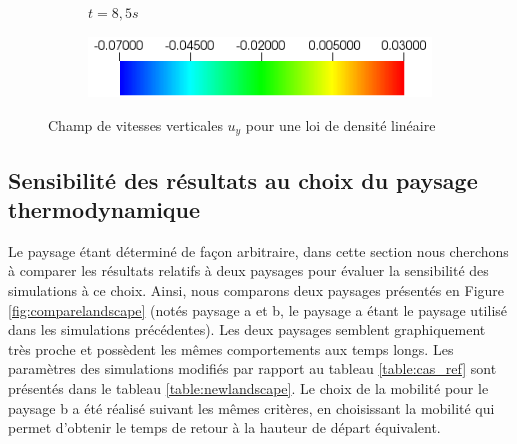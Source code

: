 \begin{figure}[H]
\begin{subfigure}[ht!]{0.18\textwidth}
		\caption{$t=8,5s$}
	\end{subfigure}
	\begin{subfigure}[ht!]{0.4\textwidth}
	\centering
	\includegraphics[width=1\textwidth]{fig_plateau_vitesse2/colorbar2.png}
\end{subfigure}
	\caption{Champ de vitesses verticales $u_y$ pour une loi de densité linéaire}
	\label{fig:secondplat2}
\end{figure}

\subsection{Sensibilité des résultats au choix du paysage thermodynamique}
Le paysage étant déterminé de façon arbitraire, dans cette section nous cherchons à comparer les résultats relatifs à deux paysages pour évaluer la sensibilité des simulations à ce choix. Ainsi, nous comparons deux paysages présentés en Figure \ref{fig:comparelandscape} (notés paysage a et b, le paysage a étant le paysage utilisé dans les simulations précédentes). Les deux paysages semblent graphiquement très proche et possèdent les mêmes comportements aux temps longs. Les paramètres des simulations modifiés par rapport au tableau \ref{table:cas_ref} sont présentés dans le tableau \ref{table:newlandscape}. Le choix de la mobilité pour le paysage b a été réalisé suivant les mêmes critères, en choisissant la mobilité qui permet d'obtenir le temps de retour à la hauteur de départ équivalent.
